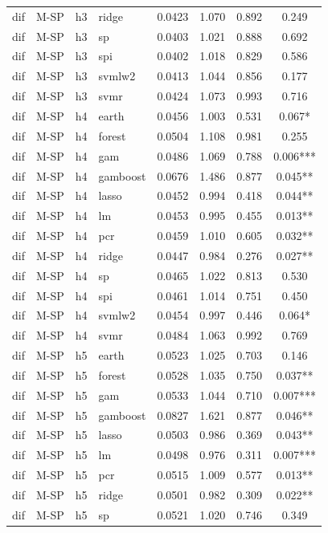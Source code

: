 \begin{ThreePartTable}
\begin{longtable}[t]{llclcccc}
dif & M-SP & h3 & ridge & 0.0423 & 1.070 & 0.892 & 0.249\\
dif & M-SP & h3 & sp & 0.0403 & 1.021 & 0.888 & 0.692\\
dif & M-SP & h3 & spi & 0.0402 & 1.018 & 0.829 & 0.586\\
dif & M-SP & h3 & svmlw2 & 0.0413 & 1.044 & 0.856 & 0.177\\
dif & M-SP & h3 & svmr & 0.0424 & 1.073 & 0.993 & 0.716\\
\addlinespace
dif & M-SP & h4 & earth & 0.0456 & 1.003 & 0.531 & 0.067*\\
dif & M-SP & h4 & forest & 0.0504 & 1.108 & 0.981 & 0.255\\
dif & M-SP & h4 & gam & 0.0486 & 1.069 & 0.788 & 0.006***\\
dif & M-SP & h4 & gamboost & 0.0676 & 1.486 & 0.877 & 0.045**\\
dif & M-SP & h4 & lasso & 0.0452 & 0.994 & 0.418 & 0.044**\\
dif & M-SP & h4 & lm & 0.0453 & 0.995 & 0.455 & 0.013**\\
dif & M-SP & h4 & pcr & 0.0459 & 1.010 & 0.605 & 0.032**\\
dif & M-SP & h4 & ridge & 0.0447 & 0.984 & 0.276 & 0.027**\\
dif & M-SP & h4 & sp & 0.0465 & 1.022 & 0.813 & 0.530\\
dif & M-SP & h4 & spi & 0.0461 & 1.014 & 0.751 & 0.450\\
dif & M-SP & h4 & svmlw2 & 0.0454 & 0.997 & 0.446 & 0.064*\\
dif & M-SP & h4 & svmr & 0.0484 & 1.063 & 0.992 & 0.769\\
\addlinespace
dif & M-SP & h5 & earth & 0.0523 & 1.025 & 0.703 & 0.146\\
dif & M-SP & h5 & forest & 0.0528 & 1.035 & 0.750 & 0.037**\\
dif & M-SP & h5 & gam & 0.0533 & 1.044 & 0.710 & 0.007***\\
dif & M-SP & h5 & gamboost & 0.0827 & 1.621 & 0.877 & 0.046**\\
dif & M-SP & h5 & lasso & 0.0503 & 0.986 & 0.369 & 0.043**\\
dif & M-SP & h5 & lm & 0.0498 & 0.976 & 0.311 & 0.007***\\
dif & M-SP & h5 & pcr & 0.0515 & 1.009 & 0.577 & 0.013**\\
dif & M-SP & h5 & ridge & 0.0501 & 0.982 & 0.309 & 0.022**\\
dif & M-SP & h5 & sp & 0.0521 & 1.020 & 0.746 & 0.349\\

\end{longtable}
\end{ThreePartTable}

